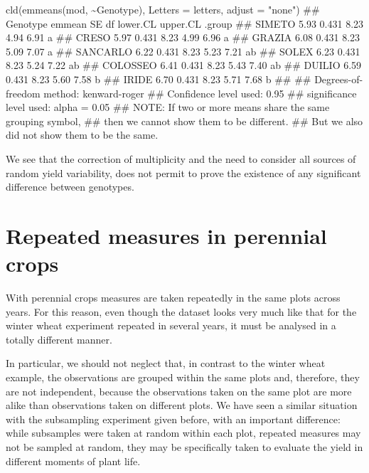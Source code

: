 \documentclass[a4paper,12pt,oneside]{book}
\newenvironment{Shaded}{\begin{snugshade}}{\end{snugshade}}
\newcommand{\SpecialCharTok}[1]{#1}
\newcommand{\StringTok}[1]{#1}
\newcommand{\DocumentationTok}[1]{#1}
\newcommand{\FunctionTok}[1]{#1}
\newcommand{\AttributeTok}[1]{#1}
\newcommand{\AlertTok}[1]{#1}
\newcommand{\NormalTok}[1]{#1}
\begin{document}
\begin{Shaded}
\begin{Highlighting}[]
\FunctionTok{cld}\NormalTok{(}\FunctionTok{emmeans}\NormalTok{(mod, }\SpecialCharTok{\textasciitilde{}}\NormalTok{Genotype), }\AttributeTok{Letters =}\NormalTok{ letters,}
    \AttributeTok{adjust =} \StringTok{"none"}\NormalTok{)}
\DocumentationTok{\#\#  Genotype emmean    SE   df lower.CL upper.CL .group}
\DocumentationTok{\#\#  SIMETO     5.93 0.431 8.23     4.94     6.91  a    }
\DocumentationTok{\#\#  CRESO      5.97 0.431 8.23     4.99     6.96  a    }
\DocumentationTok{\#\#  GRAZIA     6.08 0.431 8.23     5.09     7.07  a    }
\DocumentationTok{\#\#  SANCARLO   6.22 0.431 8.23     5.23     7.21  ab   }
\DocumentationTok{\#\#  SOLEX      6.23 0.431 8.23     5.24     7.22  ab   }
\DocumentationTok{\#\#  COLOSSEO   6.41 0.431 8.23     5.43     7.40  ab   }
\DocumentationTok{\#\#  DUILIO     6.59 0.431 8.23     5.60     7.58   b   }
\DocumentationTok{\#\#  IRIDE      6.70 0.431 8.23     5.71     7.68   b   }
\DocumentationTok{\#\# }
\DocumentationTok{\#\# Degrees{-}of{-}freedom method: kenward{-}roger }
\DocumentationTok{\#\# Confidence level used: 0.95 }
\DocumentationTok{\#\# significance level used: alpha = 0.05 }
\DocumentationTok{\#\# }\AlertTok{NOTE}\DocumentationTok{: If two or more means share the same grouping symbol,}
\DocumentationTok{\#\#       then we cannot show them to be different.}
\DocumentationTok{\#\#       But we also did not show them to be the same.}
\end{Highlighting}
\end{Shaded}

We see that the correction of multiplicity and the need to consider all sources of random yield variability, does not permit to prove the existence of any significant difference between genotypes.

\hypertarget{repeated-measures-in-perennial-crops}{%
\section{Repeated measures in perennial crops}\label{repeated-measures-in-perennial-crops}}

With perennial crops measures are taken repeatedly in the same plots across years. For this reason, even though the dataset looks very much like that for the winter wheat experiment repeated in several years, it must be analysed in a totally different manner.

In particular, we should not neglect that, in contrast to the winter wheat example, the observations are grouped within the same plots and, therefore, they are not independent, because the observations taken on the same plot are more alike than observations taken on different plots. We have seen a similar situation with the subsampling experiment given before, with an important difference: while subsamples were taken at random within each plot, repeated measures may not be sampled at random, they may be specifically taken to evaluate the yield in different moments of plant life.
\end{document}
